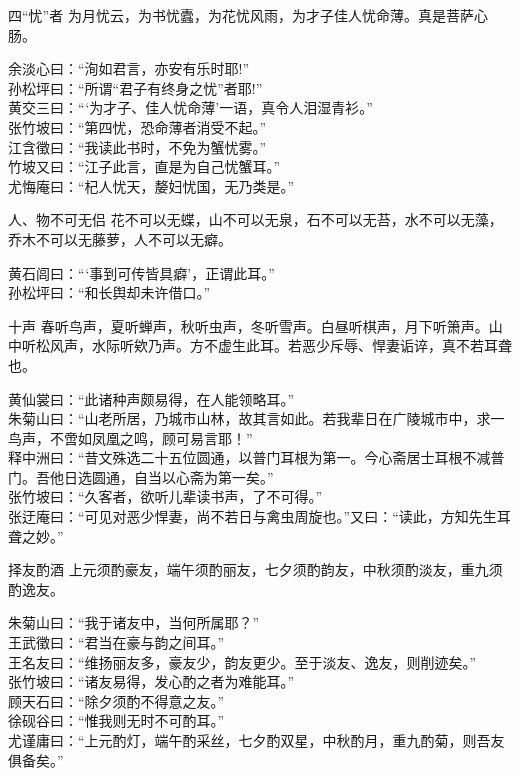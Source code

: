 \begin{yulu}{四“忧”者}
为月忧云，为书忧蠹，为花忧风雨，为才子佳人忧命薄。真是菩萨心肠。
\begin{comments}
余淡心曰：“洵如君言，亦安有乐时耶!” \\
孙松坪曰：“所谓“君子有终身之忧”者耶!” \\
黄交三曰：“‘为才子、佳人忧命薄’一语，真令人泪湿青衫。” \\
张竹坡曰：“第四忧，恐命薄者消受不起。” \\
江含徵曰：“我读此书时，不免为蟹忧雾。” \\
竹坡又曰：“江子此言，直是为自己忧蟹耳。” \\
尤悔庵曰：“杞人忧天，嫠妇忧国，无乃类是。”
\end{comments}
\end{yulu}

\begin{yulu}{人、物不可无侣}
花不可以无蝶，山不可以无泉，石不可以无苔，水不可以无藻，乔木不可以无藤萝，人不可以无癖。
\begin{comments}
黄石闾曰：“‘事到可传皆具癖’，正谓此耳。” \\
孙松坪曰：“和长舆却未许借口。”
\end{comments}
\end{yulu}

\begin{yulu}{十声}
春听鸟声，夏听蝉声，秋听虫声，冬听雪声。白昼听棋声，月下听箫声。山中听松风声，水际听欸乃声。方不虚生此耳。若恶少斥辱、悍妻诟谇，真不若耳聋也。
\begin{comments}
黄仙裳曰：“此诸种声颇易得，在人能领略耳。” \\
朱菊山曰：“山老所居，乃城市山林，故其言如此。若我辈日在广陵城市中，求一鸟声，不啻如凤凰之鸣，顾可易言耶！” \\
释中洲曰：“昔文殊选二十五位圆通，以普门耳根为第一。今心斋居士耳根不减普门。吾他日选圆通，自当以心斋为第一矣。” \\
张竹坡曰：“久客者，欲听儿辈读书声，了不可得。” \\
张迂庵曰：“可见对恶少悍妻，尚不若日与禽虫周旋也。”又曰：“读此，方知先生耳聋之妙。”
\end{comments}
\end{yulu}

\begin{yulu}{择友酌酒}
上元须酌豪友，端午须酌丽友，七夕须酌韵友，中秋须酌淡友，重九须酌逸友。
\begin{comments}
朱菊山曰：“我于诸友中，当何所属耶？” \\
王武徵曰：“君当在豪与韵之间耳。” \\
王名友曰：“维扬丽友多，豪友少，韵友更少。至于淡友、逸友，则削迹矣。” \\
张竹坡曰：“诸友易得，发心酌之者为难能耳。” \\
顾天石曰：“除夕须酌不得意之友。” \\
徐砚谷曰：“惟我则无时不可酌耳。” \\
尤谨庸曰：“上元酌灯，端午酌采丝，七夕酌双星，中秋酌月，重九酌菊，则吾友俱备矣。”
\end{comments}
\end{yulu}

